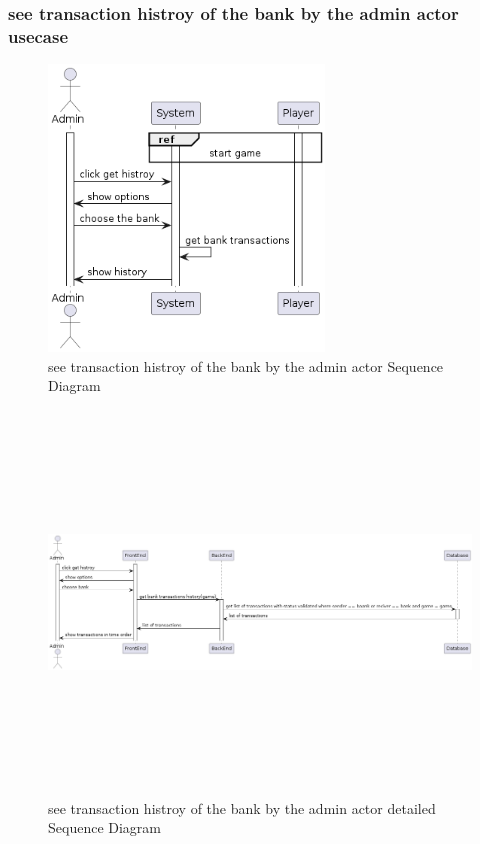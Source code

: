 \documentclass{article}
\begin{document}
\subsubsection{see transaction histroy of the bank by the admin actor usecase}
\begin{figure}[H]
	\centering
	\includegraphics[height=3in]{../thesis_tex/assets/diagrams/see_transaction_history_of_bank_SD.png}
	\caption{see transaction histroy of the bank by the admin actor Sequence Diagram}
\end{figure}

\begin{figure}[H]
	\centering
	\includegraphics[height=4in,width=6in]{../thesis_tex/assets/diagrams/see_transaction_history_of_bank_detailedSD.png}
	\caption{see transaction histroy of the bank by the admin actor detailed Sequence Diagram}
\end{figure}
\end{document}
